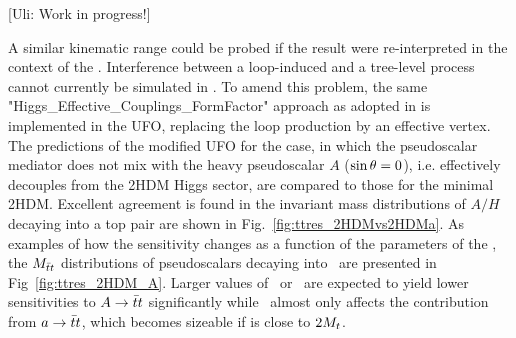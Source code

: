 {\color{red} [Uli: Work in progress!]}

 A similar kinematic range could be probed if the result were re-interpreted in the context of the \hdma. Interference between
a loop-induced and a tree-level process cannot currently be simulated in \mg. To amend this problem, the same "Higgs\_Effective\_Couplings\_FormFactor"
approach \cite{ttinterfHFF} as adopted in \cite{Aaboud:2017hnm} is implemented in the UFO, replacing the loop production by an 
effective vertex. The predictions of the modified UFO for the case, in which the pseudoscalar mediator does not mix with the heavy pseudoscalar $A$ ($\sin\theta=0$), i.e. effectively decouples from the 2HDM Higgs sector, are compared to those for the minimal 2HDM. Excellent agreement is found in the invariant mass distributions of $A/H$ decaying into a top pair are shown in Fig.~\ref{fig:ttres_2HDMvs2HDMa}. As examples of how the sensitivity changes as a function of the parameters of the \hdma, the $M_{\bar{t}t}$ distributions of pseudoscalars decaying into \ttbar\ are presented in Fig~\ref{fig:ttres_2HDM_A}. Larger values of \tanb\ or \sinp\ are expected to yield lower sensitivities to $A\rightarrow\bar{t}t$ significantly while \ma\ almost only affects the contribution from $a\rightarrow\bar{t}t$, which becomes sizeable if \ma is close to $2M_{t}$.


